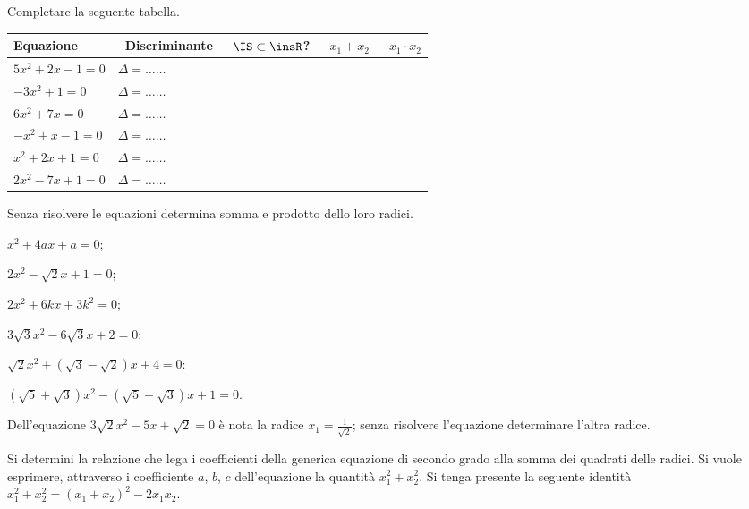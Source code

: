 \begin{esercizio}
 \label{ese:3.67}
Completare la seguente tabella.

 \begin{tabular*}{.9\textwidth}{@{\extracolsep{\fill}}*{5}{l}}
 \toprule
 Equazione &~Discriminante&~$\IS\subset\insR$? &~$x_1 + x_2$ &~$x_1 \cdot x_2$\\
\midrule
 $5 x^{2} + 2 x-1 = 0$& $\Delta=\ldots \ldots$ & &	&\\
 $- 3 x^{2} + 1 = 0$&$\Delta=\ldots \ldots$ & &	&\\
 $6 x^{2} + 7 x = 0$&$\Delta=\ldots \ldots$ & &	&\\
 $- x^{2} + x-1 = 0$&$\Delta=\ldots \ldots$ & &	&\\
 $x^{2} + 2 x + 1 = 0$&$\Delta=\ldots \ldots$ & &	&\\
 $2 x^{2}-7 x + 1 = 0$&$\Delta=\ldots \ldots $ & &	&\\
\bottomrule
 \end{tabular*}

\end{esercizio}
\pagebreak
\begin{esercizio}
 \label{ese:3.68}
Senza risolvere le equazioni determina somma e prodotto dello loro radici.
\begin{multicols}{2}
\begin{enumeratea}
\item $x^{2} + 4ax + a = 0$;
\item $2x^{2}-\sqrt{2} x + 1 = 0$;
\item $2x^{2} + 6kx + 3k^{2} = 0$;
\item $3 \sqrt{3} x^{2}-6 \sqrt{3} x + 2 = 0$:
\item $\sqrt{2} x^{2} + (\sqrt{3}-\sqrt{2}) x + 4 = 0$:
\item $(\sqrt{5} + \sqrt{3}) x^{2}-(\sqrt{5}-\sqrt{3}) x + 1= 0$.
\end{enumeratea}
\end{multicols}
\end{esercizio}

\begin{esercizio}
 \label{ese:3.69}
Dell'equazione $3 \sqrt{2} x^{2}-5 x + \sqrt{2} = 0$ è nota la radice $x_{1} = \frac{1}{\sqrt{2}}$; senza risolvere l'equazione determinare l'altra radice.
\end{esercizio}

\begin{esercizio}
 \label{ese:3.70}
Si determini la relazione che lega i coefficienti della generica equazione di secondo grado alla somma dei quadrati delle radici. Si vuole esprimere,
attraverso i coefficiente $a$, $b$, $c$ dell'equazione la quantità $x_{1}^{2} + x_{2}^{2}$. Si tenga presente la seguente identità $x_{1}^{2} + x_{2}^{2} = (x_{1} + x_{2} )^{2}-2 x_{1} x_{2}$.
\end{esercizio}

